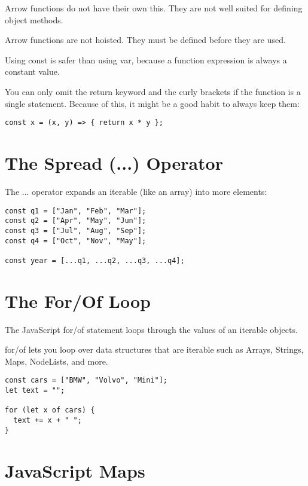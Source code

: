 \documentclass[a4paper,12pt]{article}
\begin{document}
\begin{large}
Arrow functions do not have their own this. They are not well suited for defining object methods.

Arrow functions are not hoisted. They must be defined before they are used.

Using const is safer than using var, because a function expression is always a constant value.

You can only omit the return keyword and the curly brackets if the function is a single statement. Because of this, it might be a good habit to always keep them:

\begin{lstlisting}
const x = (x, y) => { return x * y };
\end{lstlisting}




\section*{The Spread (...) Operator}

The ... operator expands an iterable (like an array) into more elements:

\begin{lstlisting}
const q1 = ["Jan", "Feb", "Mar"];
const q2 = ["Apr", "May", "Jun"];
const q3 = ["Jul", "Aug", "Sep"];
const q4 = ["Oct", "Nov", "May"];

const year = [...q1, ...q2, ...q3, ...q4];
\end{lstlisting}





\section*{The For/Of Loop}

The JavaScript for/of statement loops through the values of an iterable objects.

for/of lets you loop over data structures that are iterable such as Arrays, Strings, Maps, NodeLists, and more.

\begin{lstlisting}
const cars = ["BMW", "Volvo", "Mini"];
let text = "";

for (let x of cars) {
  text += x + " ";
}
\end{lstlisting}





\section*{JavaScript Maps}


\end{large}
\end{document}
